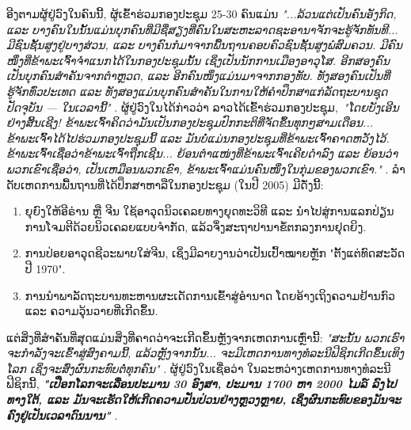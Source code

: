 \documentclass[10pt,twocolumn,letterpaper]{article}
\begin{document}
ອີງຕາມຜູ້ຢູ່ວົງໃນຄົນນີ້, ຜູ້ເຂົ້າຮ່ວມກອງປະຊຸມ 25-30 ຄົນແມ່ນ \textit{"...ລ້ວນແຕ່ເປັນຄົນອັງກິດ, ແລະ ບາງຄົນໃນນັ້ນແມ່ນບຸກຄົນທີ່ມີຊື່ສຽງທີ່ຄົນໃນສະຫະລາດຊະອານາຈັກຈະຮູ້ຈັກທັນທີ... ມີຊົນຊັ້ນສູງຢູ່ບາງສ່ວນ, ແລະ ບາງຄົນກໍມາຈາກພື້ນຖານຄອບຄົວຊົນຊັ້ນສູງພໍສົມຄວນ. ມີຄົນໜຶ່ງທີ່ຂ້າພະເຈົ້າຈຳແນກໄດ້ໃນກອງປະຊຸມນັ້ນ ເຊິ່ງເປັນນັກການເມືອງອາວຸໂສ. ອີກສອງຄົນເປັນບຸກຄົນສຳຄັນຈາກຕຳຫຼວດ, ແລະ ອີກຄົນໜຶ່ງແມ່ນມາຈາກກອງທັບ. ທັງສອງຄົນເປັນທີ່ຮູ້ຈັກທົ່ວປະເທດ ແລະ ທັງສອງແມ່ນບຸກຄົນສຳຄັນໃນການໃຫ້ຄຳປຶກສາແກ່ລັດຖະບານຊຸດປັດຈຸບັນ — ໃນເວລານີ້"} \cite{4}.
ຜູ້ຢູ່ວົງໃນໄດ້ກ່າວວ່າ ລາວໄດ້ເຂົ້າຮ່ວມກອງປະຊຸມ,\ \textit{"ໂດຍບັງເອີນຢ່າງສິ້ນເຊີງ! ຂ້າພະເຈົ້າຄິດວ່າມັນເປັນກອງປະຊຸມປົກກະຕິທີ່ຈັດຂຶ້ນທຸກໆສາມເດືອນ... ຂ້າພະເຈົ້າໄດ້ໄປຮ່ວມກອງປະຊຸມນີ້ ແລະ ມັນບໍ່ແມ່ນກອງປະຊຸມທີ່ຂ້າພະເຈົ້າຄາດຫວັງໄວ້. ຂ້າພະເຈົ້າເຊື່ອວ່າຂ້າພະເຈົ້າຖືກເຊີນ... ຍ້ອນຕໍາແໜ່ງທີ່ຂ້າພະເຈົ້າເຄີຍດໍາລົງ ແລະ ຍ້ອນວ່າພວກເຂົາເຊື່ອວ່າ, ເປັນເຫມືອນພວກເຂົາ, ຂ້າພະເຈົ້າແມ່ນຄົນໜຶ່ງໃນກຸ່ມຂອງພວກເຂົາ."} \cite{4}.
ລໍາດັບເຫດການພື້ນຖານທີ່ໄດ້ປຶກສາຫາລືໃນກອງປະຊຸມ (ໃນປີ 2005) ມີດັ່ງນີ້: 

\begin{flushleft}
\begin{enumerate}
    \item ຍຸຍົງໃຫ້ອີຣ່ານ ຫຼື ຈີນ ໃຊ້ອາວຸດນິວເຄລຍທາງຍຸດທະວິທີ ແລະ ນໍາໄປສູ່ການແລກປ່ຽນການໂຈມຕີດ້ວຍນິວເຄລຍແບບຈໍາກັດ, ແລ້ວຈຶ່ງສະຖາປານາຂໍ້ຕກລງການຢຸດຍິງ.
    \item ການປ່ອຍອາວຸດຊີວະພາບໃສ່ຈີນ, ເຊິ່ງມີລາຍງານວ່າເປັນເປົ້າໝາຍຫຼັກ "ຕັ້ງແຕ່ທົດສະວັດປີ 1970".
    \item ການນໍາພາລັດຖະບານທະຫານຜະເດັດການເຂົ້າສູ່ອໍານາດ ໂດຍອ້າງເຖິງຄວາມຢ້ານກົວ ແລະ ຄວາມວຸ້ນວາຍທີ່ເກີດຂຶ້ນ.
\end{enumerate}
\end{flushleft}

ແຕ່ສິ່ງທີ່ສຳຄັນທີ່ສຸດແມ່ນສິ່ງທີ່ຄາດວ່າຈະເກີດຂຶ້ນຫຼັງຈາກເຫດການເຫຼົ່ານີ້: \textit{"ສະນັ້ນ ພວກເຮົາຈະກຳລັງຈະເຂົ້າສູ່ສົງຄາມນີ້, ແລ້ວຫຼັງຈາກນັ້ນ... ຈະມີເຫດການທາງທໍລະນີຟີຊິກເກີດຂຶ້ນເທິງໂລກ ເຊິ່ງຈະສົ່ງຜົນກະທົບຕໍ່ທຸກຄົນ"} \cite{4}.
ຜູ້ຢູ່ວົງໃນເຊື່ອວ່າ ໃນລະຫວ່າງເຫດການທາງທໍລະນີຟີຊິກນີ້, \textit{\textbf{"ເປືອກໂລກຈະເລື່ອນປະມານ 30 ອົງສາ, ປະມານ 1700 ຫາ 2000 ໄມລ໌ ລົງໄປທາງໃຕ້, ແລະ ມັນຈະເຮັດໃຫ້ເກີດຄວາມປັ່ນປ່ວນຢ່າງຫຼວງຫຼາຍ, ເຊິ່ງຜົນກະທົບຂອງມັນຈະຄົງຢູ່ເປັນເວລາດົນນານ"}} \cite{4}. 
\end{document}
